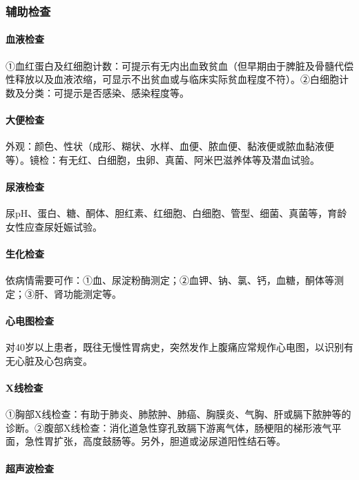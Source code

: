 \subsubsection{辅助检查}

\paragraph{血液检查}

①血红蛋白及红细胞计数：可提示有无内出血致贫血（但早期由于脾脏及骨髓代偿性释放以及血液浓缩，可显示不出贫血或与临床实际贫血程度不符）。②白细胞计数及分类：可提示是否感染、感染程度等。

\paragraph{大便检查}

外观：颜色、性状（成形、糊状、水样、血便、脓血便、黏液便或脓血黏液便等）。镜检：有无红、白细胞，虫卵、真菌、阿米巴滋养体等及潜血试验。

\paragraph{尿液检查}

尿pH、蛋白、糖、酮体、胆红素、红细胞、白细胞、管型、细菌、真菌等，育龄女性应查尿妊娠试验。

\paragraph{生化检查}

依病情需要可作：①血、尿淀粉酶测定；②血钾、钠、氯、钙，血糖，酮体等测定；③肝、肾功能测定等。

\paragraph{心电图检查}

对40岁以上患者，既往无慢性胃病史，突然发作上腹痛应常规作心电图，以识别有无心脏及心包病变。

\paragraph{X线检查}

①胸部X线检查：有助于肺炎、肺脓肿、肺癌、胸膜炎、气胸、肝或膈下脓肿等的诊断。②腹部X线检查：消化道急性穿孔致膈下游离气体，肠梗阻的梯形液气平面，急性胃扩张，高度鼓肠等。另外，胆道或泌尿道阳性结石等。

\paragraph{超声波检查}

